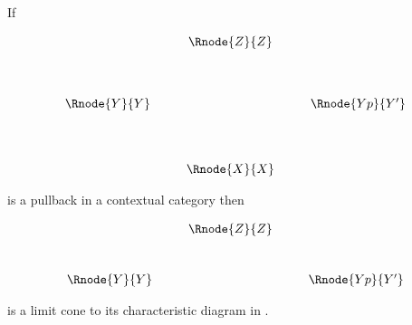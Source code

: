 \documentclass[10pt,a4paper]{scrartcl}
\newcommand{\ccatc}{contextual category \ccat}
\begin{document}
\begin{lemma}
If 
\begin{center}
\begin{displaymath}
\begin{array}{cp{0.3cm}c    p{0.3cm}  c }
               & & \Rnode{Z}{Z} & &                                  \\ [1.3cm]
\Rnode{Y}{Y}   &&                               & & \Rnode{Yp}{Y'}   \\ [1.4cm]
               & & \Rnode{X}{X} & &   
\end{array}
\end{displaymath}
\end{center}

is a pullback in a \ccatc 
then 
\begin{center}
\begin{equation}
\label{pbselflimitcone}
\begin{array}{cp{0.3cm}c    p{0.3cm}  c }
               & & \Rnode{Z}{Z} & &                                  \\ [1.0cm]
\Rnode{Y}{Y}   &&                               & & \Rnode{Yp}{Y'}  
\end{array}
\end{equation}
\end{center}
is a limit cone to its characteristic diagram in \ccat.
\end{lemma}
\end{document}
